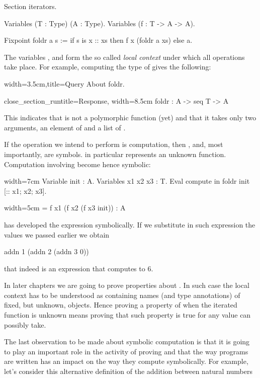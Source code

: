 \begin{coq}{}{}
Section iterators.

Variables (T : Type) (A : Type).
Variables (f : T -> A -> A).

Fixpoint foldr a s :=
  if s is x :: xs then f x (foldr a xs) else a.
\end{coq}

The variables ,  and  form the so called
\emph{local context} under which all operations take place.
For example, computing the type of  gives the following:

\begin{coq}{}{width=3.5cm,title=Query}
About foldr.
\end{coq}
\begin{coqout}{close_section_run}{title=Response, width=8.5cm}
foldr : A -> seq T -> A
\end{coqout}

This indicates that  is not a polymorphic function (yet)
and that it takes only two arguments, an element of  and
a list of .

If the operation we intend to perform is computation, then
,  and, most importantly,  are symbols.
  in particular represents an unknown function.
Computation involving  become hence symbolic:

\begin{coq}{}{width=7cm}
Variable init : A.
Variables x1 x2 x3 : T.
Eval compute in
  foldr init [:: x1; x2; x3].
\end{coq}
\begin{coqout}{}{width=5cm}
= f x1 (f x2 (f x3 init))
: A	
\end{coqout}

\Coq{} has developed the expression symbolically.  If we substitute
in such expression the values we passed earlier we obtain

\begin{coq}{}{}
addn 1 (addn 2 (addn 3 0))
\end{coq}
that indeed is an expression that computes to 6.

In later chapters we are going to prove properties about .
In such case the local context has to be understood as containing
names (and type annotations) of fixed, but unknown, objects.
Hence proving a property of  when the iterated function
 is unknown means proving that such property is true for any
value  can possibly take.

The last observation to be made about symbolic computation is that
it is going to play an important role in the activity of proving
and that the way programs are written has an impact on the way they
compute symbolically.  For example, let's consider this alternative
definition of the addition between natural numbers

